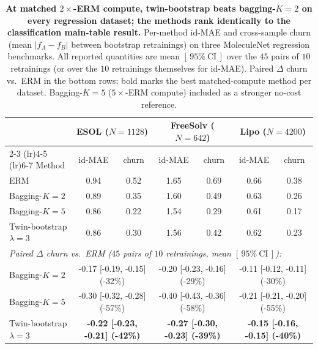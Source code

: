 \begin{table}[h]
\centering
\caption{\textbf{\boldmath At matched $2\times$-ERM compute, twin-bootstrap beats bagging-$K{=}2$ on every regression dataset; the methods rank identically to the classification main-table result.}  Per-method id-MAE and cross-sample churn (mean $|f_A - f_B|$ between bootstrap retrainings) on three MoleculeNet regression benchmarks.  All reported quantities are mean $[\,95\%\ \text{CI}\,]$ over the $45$ pairs of $10$ retrainings (or over the $10$ retrainings themselves for id-MAE).  Paired $\Delta$ churn vs.\ ERM in the bottom rows; bold marks the best matched-compute method per dataset.  Bagging-$K{=}5$ ($5\times$-ERM compute) included as a stronger no-cost reference.}
\label{tab:regression}
\scriptsize
\begin{tabular}{lcccccc}
\toprule
& \multicolumn{2}{c}{ESOL ($N{=}1128$)} & \multicolumn{2}{c}{FreeSolv ($N{=}642$)} & \multicolumn{2}{c}{Lipo ($N{=}4200$)} \\
\cmidrule(lr){2-3} \cmidrule(lr){4-5} \cmidrule(lr){6-7}
Method & id-MAE & churn & id-MAE & churn & id-MAE & churn \\
\midrule
ERM & 0.94 & 0.52 & 1.65 & 0.69 & 0.66 & 0.38 \\
Bagging-$K{=}2$ & 0.89 & 0.35 & 1.60 & 0.49 & 0.63 & 0.26 \\
Bagging-$K{=}5$ & 0.86 & 0.22 & 1.54 & 0.29 & 0.61 & 0.17 \\
Twin-bootstrap $\lambda{=}3$ & 0.86 & 0.30 & 1.56 & 0.42 & 0.62 & 0.23 \\
\midrule
\multicolumn{7}{l}{\emph{Paired $\Delta$ churn vs.\ ERM ($45$ pairs of $10$ retrainings, mean $[\,95\%\ \text{CI}\,]$):}} \\
Bagging-$K{=}2$ & \multicolumn{2}{c}{-0.17 [-0.19, -0.15] (-32\%)} & \multicolumn{2}{c}{-0.20 [-0.23, -0.16] (-29\%)} & \multicolumn{2}{c}{-0.11 [-0.12, -0.11] (-30\%)} \\
Bagging-$K{=}5$ & \multicolumn{2}{c}{-0.30 [-0.32, -0.28] (-57\%)} & \multicolumn{2}{c}{-0.40 [-0.43, -0.36] (-58\%)} & \multicolumn{2}{c}{-0.21 [-0.21, -0.20] (-55\%)} \\
Twin-bootstrap $\lambda{=}3$ & \multicolumn{2}{c}{\textbf{-0.22 [-0.23, -0.21] (-42\%)}} & \multicolumn{2}{c}{\textbf{-0.27 [-0.30, -0.23] (-39\%)}} & \multicolumn{2}{c}{\textbf{-0.15 [-0.16, -0.15] (-40\%)}} \\
\bottomrule
\end{tabular}
\end{table}
